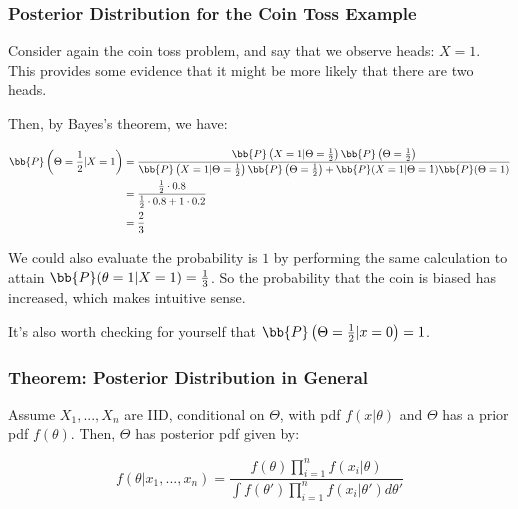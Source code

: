 \documentclass[a4paper]{article}
\begin{document}
            \subsubsection{Posterior Distribution for the Coin Toss Example}
                Consider again the coin toss problem, and say that we observe
                heads: $X = 1$. This provides some evidence that it might be
                more likely that there are two heads.

                Then, by Bayes's theorem, we have:

                \begin{align*}
                    \bb{P}\left(\Theta = \frac{1}{2} | X = 1\right) & =
                        \frac{\bb{P}\left(X = 1 | \Theta = \frac{1}{2}\right)
                        \bb{P}\left(\Theta = \frac{1}{2}\right)}{\bb{P}\left(X =
                        1 | \Theta = \frac{1}{2}\right)\bb{P}\left(\Theta =
                        \frac{1}{2} \right) + \bb{P}(X = 1 | \Theta = 1)
                        \bb{P}(\Theta = 1)} \\
                    & = \frac{\frac{1}{2} \cdot 0.8}{\frac{1}{2} \cdot 0.8 + 1
                        \cdot 0.2} \\
                    & = \frac{2}{3}
                \end{align*}

                We could also evaluate the probability is $1$ by performing the
                same calculation to attain $\bb{P}(\theta = 1 | X = 1) =
                \frac{1}{3}$. So the probability that the coin is biased has
                increased, which makes intuitive sense.

                It's also worth checking for yourself that $\bb{P}\left(\Theta =
                \frac{1}{2} | x = 0\right) = 1$.

            \subsubsection{Theorem: Posterior Distribution in General}
                Assume $X_1, ..., X_n$ are IID, conditional on $\Theta$, with
                pdf $f(x | \theta)$ and $\Theta$ has a prior pdf $f(\theta)$.
                Then, $\Theta$ has posterior pdf given by:

                \[
                    f(\theta | x_1, ..., x_n) = \frac{f(\theta) \prod_{i=1}^n
                    f(x_i | \theta)}{\int f(\theta ') \prod_{i=1}^n f(x_i |
                    \theta') d\theta'}
                \]
\end{document}
